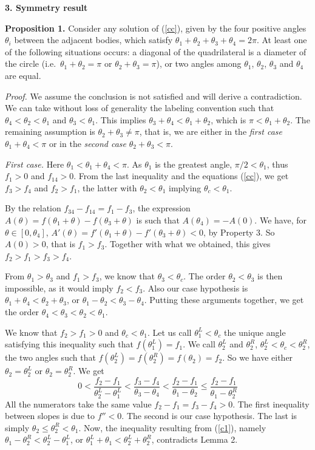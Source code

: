 \documentclass[11pt]{article}
\begin{document}
\bigskip
\centerline{\bf 3. Symmetry result}

{\bf Proposition 1.} Consider any solution of (\ref{cc}), given by the four positive angles $\theta_i$ between the adjacent bodies, which satisfy $\theta_1+\theta_2+\theta_3+\theta_4=2\pi$. At least one of the following situations occurs: a diagonal of the quadrilateral is a diameter of the circle (i.e.\ $\theta_1+\theta_2=\pi$ or $\theta_2+\theta_3=\pi$), or  two angles among $\theta_1$, $\theta_2$, $\theta_3$ and $\theta_4$ are equal.


{\sl Proof.} We assume the conclusion is not satisfied and will
derive a contradiction. We can take without loss of generality the
labeling convention such that $\theta_4<\theta_2<\theta_1$ and
$\theta_3<\theta_1$.  This implies
$\theta_3+\theta_4<\theta_1+\theta_2$, which is
$\pi<\theta_1+\theta_2$. The remaining assumption is
$\theta_2+\theta_3\neq \pi$, that is, we are either in the {\sl
first case} $\theta_1+\theta_4<\pi$ or in the {\sl second case}
$\theta_2+\theta_3<\pi$.

{\sl First case.} Here $\theta_1<\theta_1+\theta_4<\pi$.
As $\theta_1$ is the greatest angle, $\pi/2<\theta_1$, thus $f_1>0$ and $f_{14}>0$. From the
last inequality and the equations (\ref{cc}), we get $f_3>f_4$
and $f_2>f_1$, the latter with $\theta_2<\theta_1$ implying
$\theta_c<\theta_1$.

By the relation  $f_{34}-f_{14}=f_1-f_3$, the expression
$A(\theta)=f(\theta_1+\theta)-f(\theta_3+\theta)$ is such that
$A(\theta_4)=-A(0)$. We have, for $\theta\in [0,\theta_4]$,
$A'(\theta)=f'(\theta_1+\theta)-f'(\theta_3+\theta)<0$,  by Property 3. So $A(0)>0$, that is $f_1>f_3$.
Together with what we obtained, this gives
$f_2>f_1>f_3>f_4$.

From $\theta_1>\theta_3$ and $f_1>f_3$, we know that $\theta_3<\theta_c$.
The order $\theta_2<\theta_3$ is then impossible, as it would imply
$f_2<f_3$. Also our case hypothesis is
$\theta_1+\theta_4<\theta_2+\theta_3$, or
$\theta_1-\theta_2<\theta_3-\theta_4$. Putting these arguments
together, we get the order $\theta_4<\theta_3<\theta_2<\theta_1$.

We know that $f_2>f_1>0$ and $\theta_c<\theta_1$. Let us call $\theta_1^L<\theta_c$  the unique angle satisfying this inequality such that $f(\theta_1^L)=f_1$. We call $\theta_2^L$ and
$\theta_2^R$, $\theta_2^L<\theta_c<\theta_2^R$, the two angles such
that $f(\theta_2^L)=f(\theta_2^R)=f(\theta_2)=f_2$. So we have
either $\theta_2=\theta_2^L$ or $\theta_2=\theta_2^R$. We get
\begin{equation}\label{c1}
0<\frac{f_2-f_1}{\theta_2^L-\theta_1^L}<\frac{f_3-f_4}{\theta_3-\theta_4}<\frac{f_2-f_1}{\theta_1-\theta_2}\leq\frac{f_2-f_1}{\theta_1-\theta_2^R}
\end{equation}
All the numerators take the same value
$f_2-f_1=f_3-f_4>0$. The first inequality between slopes is due to
$f''<0$. The second is our case hypothesis. The last
is simply $\theta_2\leq\theta_2^R<\theta_1$. Now, the inequality resulting from (\ref{c1}), namely
$\theta_1-\theta_2^R<\theta_2^L-\theta_1^L$, or $\theta_1^L+\theta_1<\theta_2^L+\theta_2^R$, contradicts Lemma 2.
\end{document}
